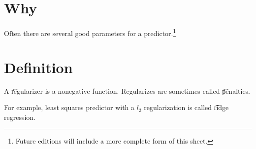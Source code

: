 
\section*{Why}

Often there are several good parameters for a predictor.\footnote{Future editions will include a more complete form of this sheet.}

\section*{Definition}

A \t{regularizer} is a nonegative function.
Regularizes are sometimes called \t{penalties}.

For example, least squares predictor with a $l_2$ regularization is called \t{ridge regression}.

\blankpage